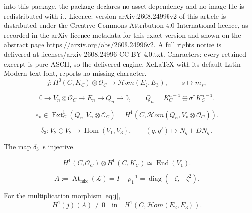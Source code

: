 \documentclass[10pt,a4paper]{amsart}
\newcommand{\At}{\operatorname{At}}
\newcommand{\End}{\operatorname{End}}
\newcommand{\Hom}{\operatorname{Hom}}
\newcommand{\cHom}{\mathcal{H}om}
\newcommand{\cL}{\mathcal L}
\newcommand{\cO}{\mathcal O}
\begin{document}
into this package, the package declares no asset dependency and no image file is redistributed with it. Licence: version arXiv:2608.24996v2 of this article is distributed under the Creative Commons Attribution 4.0 International licence, as recorded in the arXiv licence metadata for this exact version and shown on the abstract page https://arxiv.org/abs/2608.24996v2. A full rights notice is delivered at licenses/arxiv-2608.24996-CC-BY-4.0.txt. Characters: every retained excerpt is pure ASCII, so the delivered engine, XeLaTeX with its default Latin Modern text font, reports no missing character.
\begin{equation}\label{eq:j}
 j:H^0(C,K_C)\otimes\cO_C\longrightarrow\cHom(E_2,E_3),
 \qquad
 s\longmapsto m_s,
\end{equation}

\begin{equation}\label{eq:En-extension}
0\longrightarrow V_n\otimes\cO_C
\longrightarrow E_n
\longrightarrow Q_n\longrightarrow0,
\qquad
Q_n=K_C^{n-1}\oplus\sigma^*K_C^{n-1}.
\end{equation}

\begin{equation}\label{eq:en-class-target}
 e_n\in
 \operatorname{Ext}^1_C(Q_n,V_n\otimes\cO_C)
 =H^1\!\left(C,\cHom(Q_n,V_n\otimes\cO_C)\right).
\end{equation}

\begin{equation}\label{eq:delta3}
 \delta_3:V_2\oplus V_2\longrightarrow\Hom(V_1,V_3),
 \qquad
 (q,q')\longmapsto N_q+DN_{q'}.
\end{equation}

\begin{lemma}\label{lem:delta-injective}
The map $\delta_3$ is injective.
\end{lemma}

\begin{equation}\label{eq:End-identification}
H^1(C,\cO_C)\otimes H^0(C,K_C)\simeq\End(V_1).
\end{equation}

\begin{equation}\label{eq:A-matrix}
 A:=\At_{\mathrm{mix}}(\cL)
 =I-\rho_1^{-1}
 =\operatorname{diag}(-\zeta,-\zeta^2).
\end{equation}

\begin{proposition}\label{prop:explicit-nonzero}
For the multiplication morphism \eqref{eq:j},
$$
 H^1(j)(A)\neq0
 \quad\text{in}\quad
 H^1\!\left(C,\cHom(E_2,E_3)\right).
$$
\end{proposition}
\end{document}
